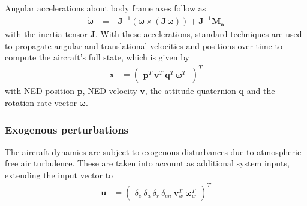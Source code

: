 \documentclass{ifacconf}
\begin{document}
Angular accelerations about body frame axes follow as
\begin{align}
\dot{\mathbf{\omega}} &= -\mathbf{J}^{-1} ({\mathbf{\omega}} 
\times 
(\mathbf{J} \,{\mathbf{\omega}}))
+ \mathbf{J}^{-1} 
\mathbf{M_a}
\end{align}
with the inertia tensor $\mathbf{J}$.
With these accelerations, standard techniques are used to propagate angular and translational velocities and positions over time to compute the aircraft's full state, which is given by
%
\begin{align}
\mathbf{x} &= 
\begin{pmatrix}
\mathbf{p}^T \:
\mathbf{v}^T \:
\mathbf{q}^T \:
\mathbf{\omega}^T \:
\end{pmatrix}^T 
\end{align}
with NED position $\mathbf{p}$, NED velocity $\mathbf{v}$, the attitude quaternion $\mathbf{q}$ and the rotation rate vector $\mathbf{\omega}$.
\subsubsection{Exogenous perturbations}
%
The aircraft dynamics are subject to exogenous disturbances due to atmospheric free air turbulence. These are taken into account as additional system inputs, extending the input vector to
%
\begin{align}
\mathbf{u} &= 
\begin{pmatrix}
\delta_{e} \:
\delta_{a} \:
\delta_{r} \:
\delta_{en} \:
\mathbf{v}_w^T \:
\mathbf{\omega}_w^T
\end{pmatrix}^T
\end{align}
\end{document}
